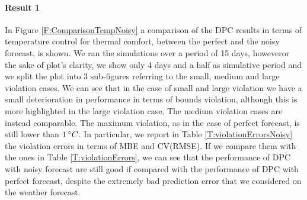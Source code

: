 \textcolor[rgb]{0,0,1}{\paragraph{Result 1} In Figure \ref{F:ComparisonTempNoisy} a comparison of the DPC results in terms of temperature control for thermal comfort, between the perfect and the noisy forecast, is shown.
We ran the simulations over a period of 15 days, howeveror the sake of plot's clarity, we show only 4 days and a half as simulative period and we split the plot into 3 sub-figures referring to the small, medium and large violation cases.
We can see that in the case of small and large violation we have a small deterioration in performance in terms of bounds violation, although this is more highlighted in the large violation case.
The medium violation cases are instead comparable.
The maximum violation, as in the case of perfect forecast, is still lower than $1\,\degree C$.
In particular, we report in Table \ref{T:violationErrorsNoisy} the violation errors in terms of MBE and CV(RMSE).
If we compare them with the ones in Table \ref{T:violationErrors}, we can see that the performance of DPC with noisy forecast are still good if compared with the performance of DPC with perfect forecast, despite the extremely bad prediction error that we considered on the weather forecast.
}
